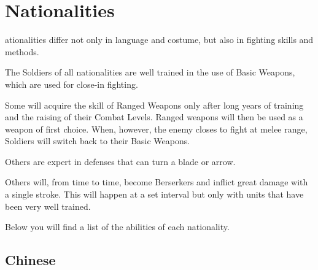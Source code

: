 
\chapter{Nationalities}

ationalities differ not only in language and costume, but also in fighting skills and methods.


The Soldiers of all nationalities are well trained in the use of Basic Weapons, which are used for close-in fighting.

Some will acquire the skill of Ranged Weapons only after long years of training and the raising of their Combat Levels. Ranged weapons will then be used as a weapon of first choice. When, however, the enemy closes to fight at melee range, Soldiers will switch back to their Basic Weapons.

Others are expert in defenses that can turn a blade or arrow.

Others will, from time to time, become Berserkers and inflict great damage with a single stroke. This will happen at a set interval but only with units that have been very well trained.

Below you will find a list of the abilities of each nationality.

\clearpage %

\section{Chinese}


